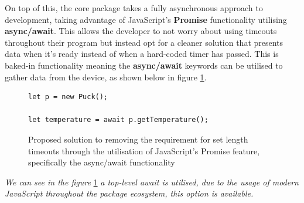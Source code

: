 \documentclass{l4proj}
\begin{document}
On top of this, the core package takes a fully asynchronous approach to development, taking advantage of JavaScript's \textbf{Promise} functionality utilising \textbf{async/await}. This allows the developer to not worry about using timeouts throughout their program but instead opt for a cleaner solution that presents data when it's ready instead of when a hard-coded timer has passed. This is baked-in functionality meaning the \textbf{async/await} keywords can be utilised to gather data from the device, as shown below in figure \ref{fig:async-await-core}.

\begin{figure}[!ht]
    \centering
    \begin{lstlisting}
let p = new Puck();

let temperature = await p.getTemperature();
    \end{lstlisting}
    \caption{Proposed solution to removing the requirement for set length timeouts through the utilisation of JavaScript's Promise feature, specifically the async/await functionality}
    \label{fig:async-await-core}
\end{figure}

\textit{We can see in the figure }\ref{fig:async-await-core} \textit{a top-level await is utilised, due to the usage of modern JavaScript throughout the package ecosystem, this option is available.}
\end{document}
